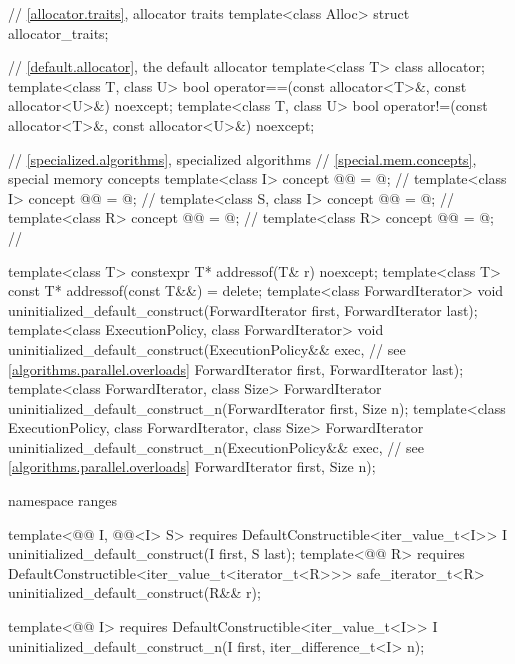 \begin{codeblock}
{  // \ref{allocator.traits}, allocator traits
  template<class Alloc> struct allocator_traits;

  // \ref{default.allocator}, the default allocator
  template<class T> class allocator;
  template<class T, class U>
    bool operator==(const allocator<T>&, const allocator<U>&) noexcept;
  template<class T, class U>
    bool operator!=(const allocator<T>&, const allocator<U>&) noexcept;

  // \ref{specialized.algorithms}, specialized algorithms
  // \ref{special.mem.concepts}, special memory concepts
  template<class I>
    concept @@ = @\seebelow@;    // \expos
  template<class I>
    concept @@ = @\seebelow@;  // \expos
  template<class S, class I>
    concept @@ = @\seebelow@;          // \expos
  template<class R>
    concept @@ = @\seebelow@;       // \expos
  template<class R>
    concept @@ = @\seebelow@;     // \expos

  template<class T>
    constexpr T* addressof(T& r) noexcept;
  template<class T>
    const T* addressof(const T&&) = delete;
  template<class ForwardIterator>
    void uninitialized_default_construct(ForwardIterator first, ForwardIterator last);
  template<class ExecutionPolicy, class ForwardIterator>
    void uninitialized_default_construct(ExecutionPolicy&& exec, // see \ref{algorithms.parallel.overloads}
                                         ForwardIterator first, ForwardIterator last);
  template<class ForwardIterator, class Size>
    ForwardIterator uninitialized_default_construct_n(ForwardIterator first, Size n);
  template<class ExecutionPolicy, class ForwardIterator, class Size>
    ForwardIterator uninitialized_default_construct_n(ExecutionPolicy&& exec, // see \ref{algorithms.parallel.overloads}
                                                      ForwardIterator first, Size n);

  namespace ranges {
    template<@@ I, @@<I> S>
      requires DefaultConstructible<iter_value_t<I>>
        I uninitialized_default_construct(I first, S last);
    template<@@ R>
      requires DefaultConstructible<iter_value_t<iterator_t<R>>>
        safe_iterator_t<R> uninitialized_default_construct(R&& r);

    template<@@ I>
      requires DefaultConstructible<iter_value_t<I>>
        I uninitialized_default_construct_n(I first, iter_difference_t<I> n);
  }

}
\end{codeblock}
